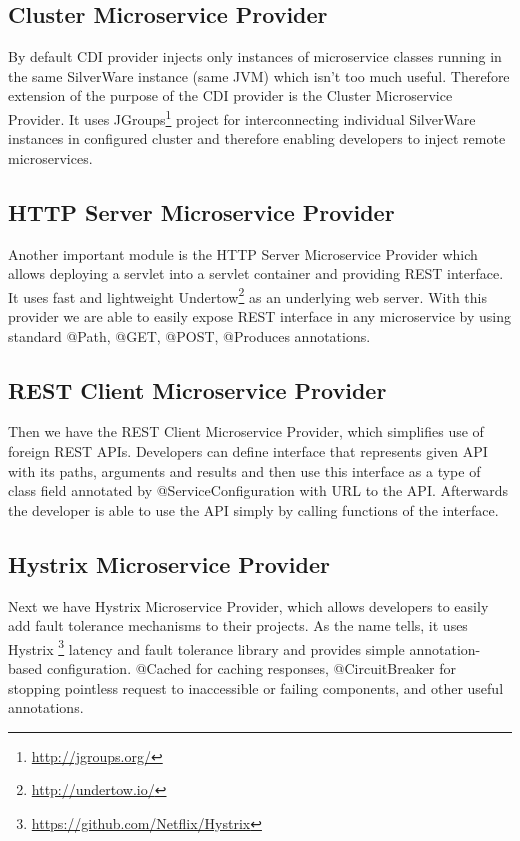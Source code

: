 \documentclass[12pt,oneside]{fithesis2}
\begin{document}
\subsection{Cluster Microservice Provider}
By default CDI provider injects only instances of microservice classes running in the same SilverWare instance (same JVM) which isn't too much useful. Therefore extension of the purpose of the CDI provider is the Cluster Microservice Provider. It uses JGroups\footnote{\url{http://jgroups.org/}} project for interconnecting individual SilverWare instances in configured cluster and therefore enabling developers to inject remote microservices.

\subsection{HTTP Server Microservice Provider}
Another important module is the HTTP Server Microservice Provider which allows deploying a servlet into a servlet container and providing REST interface. It uses fast and lightweight Undertow\footnote{\url{http://undertow.io/}} as an underlying web server. With this provider we are able to easily expose REST interface in any microservice by using standard @Path, @GET, @POST, @Produces annotations.

\subsection{REST Client Microservice Provider}
Then we have the REST Client Microservice Provider, which simplifies use of foreign REST APIs. Developers can define interface that represents given API with its paths, arguments and results and then use this interface as a type of class field annotated by @ServiceConfiguration with URL to the API. Afterwards the developer is able to use the API simply by calling functions of the interface.

\subsection{Hystrix Microservice Provider}
Next we have Hystrix Microservice Provider, which allows developers to easily add fault tolerance mechanisms to their projects. As the name tells, it uses Hystrix \footnote{\url{https://github.com/Netflix/Hystrix}} latency and fault tolerance library and provides simple annotation-based configuration. @Cached for caching responses, @CircuitBreaker for stopping pointless request to inaccessible or failing components, and other useful annotations.
\end{document}
